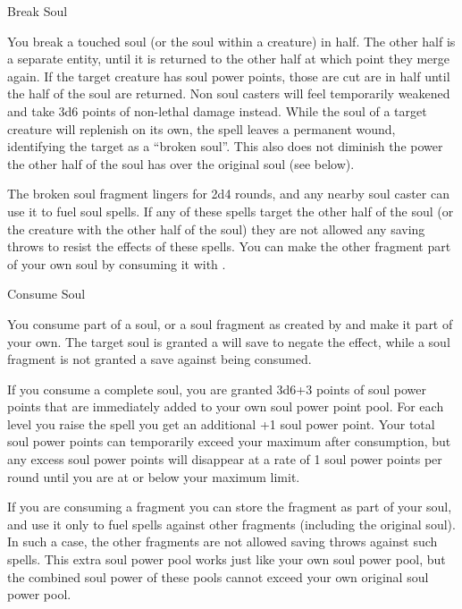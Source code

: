 \begin{soulpower}{Break Soul}

  You break a touched soul (or the soul within a creature) in half. The other
  half is a separate entity, until it is returned to the other half at which
  point they merge again. If the target creature has soul power points, those
  are cut are in half until the half of the soul are returned. Non soul
  casters will feel temporarily weakened and take 3d6 points of non-lethal
  damage instead. While the soul of a target creature will replenish on its
  own, the spell leaves a permanent wound, identifying the target as a
  ``broken soul''.  This also does not diminish the power the other half of
  the soul has over the original soul (see below).

  The broken soul fragment lingers for 2d4 rounds, and any nearby soul caster
  can use it to fuel soul spells. If any of these spells target the other half
  of the soul (or the creature with the other half of the soul) they are not
  allowed any saving throws to resist the effects of these spells.
  You can make the other fragment part of your own soul by consuming it with
  .
\end{soulpower}

\begin{soulpower}{Consume Soul}

  You consume part of a soul, or a soul fragment as created by
   and make it part of your own. The target soul
  is granted a will save to negate the effect, while a soul fragment is not
  granted a save against being consumed.

  If you consume a complete soul, you are granted 3d6+3 points of soul power
  points that are immediately added to your own soul power point pool. For
  each level you raise the spell you get an additional +1 soul power point.
  Your total soul power points can temporarily exceed your maximum after
  consumption, but any excess soul power points will disappear at a rate of
  1 soul power points per round until you are at or below your maximum limit.

  If you are consuming a fragment you can store the fragment as part of your
  soul, and use it only to fuel spells against other fragments (including the
  original soul). In such a case, the other fragments are not allowed saving
  throws against such spells. This extra soul power pool works just like your
  own soul power pool, but the combined soul power of these pools cannot
  exceed your own original soul power pool.
\end{soulpower}

